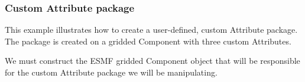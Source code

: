  
\setlength{\oldparskip}{\parskip}
\setlength{\parskip}{1.5ex}
\setlength{\oldparindent}{\parindent}
\setlength{\parindent}{0pt}
\setlength{\oldbaselineskip}{\baselineskip}
\setlength{\baselineskip}{11pt}
 
\def\bv{\begin{verbatim}}
\def\ev{\end{verbatim}}
\def\be{\begin{equation}}
\def\ee{\end{equation}}
\def\bea{\begin{eqnarray}}
\def\eea{\end{eqnarray}}
\def\bi{\begin{itemize}}
\def\ei{\end{itemize}}
\def\bn{\begin{enumerate}}
\def\en{\end{enumerate}}
\def\bd{\begin{description}}
\def\ed{\end{description}}
\def\({\left (}
\def\){\right )}
\def\[{\left [}
\def\]{\right ]}
\def\<{\left  \langle}
\def\>{\right \rangle}
\def\cI{{\cal I}}
\def\diag{\mathop{\rm diag}}
\def\tr{\mathop{\rm tr}}


 

   \subsubsection{Custom Attribute package}  \label{ex:AttributeCustPackEx}
  
   This example illustrates how to create a user-defined, custom Attribute 
   package.  The package is created on a gridded Component with three custom
   Attributes. 

      We must construct the ESMF gridded Component object that will be 
      responsible for the custom Attribute package we will be manipulating. 

